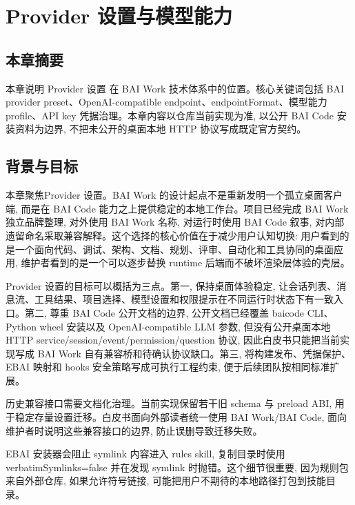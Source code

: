 \chapter{Provider 设置与模型能力}
\section{本章摘要}
本章说明 Provider 设置 在 BAI Work 技术体系中的位置。核心关键词包括 BAI provider preset、OpenAI-compatible endpoint、endpointFormat、模型能力 profile、API key 凭据治理。本章内容以仓库当前实现为准, 以公开 BAI Code 安装资料为边界, 不把未公开的桌面本地 HTTP 协议写成既定官方契约。

\section{背景与目标}
本章聚焦Provider 设置。BAI Work 的设计起点不是重新发明一个孤立桌面客户端, 而是在 BAI Code 能力之上提供稳定的本地工作台。项目已经完成 BAI Work 独立品牌整理, 对外使用 BAI Work 名称, 对运行时使用 BAI Code 叙事, 对内部遗留命名采取兼容解释。这个选择的核心价值在于减少用户认知切换: 用户看到的是一个面向代码、调试、架构、文档、规划、评审、自动化和工具协同的桌面应用, 维护者看到的是一个可以逐步替换 runtime 后端而不破坏渲染层体验的壳层。

Provider 设置的目标可以概括为三点。第一, 保持桌面体验稳定, 让会话列表、消息流、工具结果、项目选择、模型设置和权限提示在不同运行时状态下有一致入口。第二, 尊重 BAI Code 公开文档的边界, 公开文档已经覆盖 baicode CLI、Python wheel 安装以及 OpenAI-compatible LLM 参数, 但没有公开桌面本地 HTTP service/session/event/permission/question 协议, 因此白皮书只能把当前实现写成 BAI Work 自有兼容桥和待确认协议缺口。第三, 将构建发布、凭据保护、EBAI 映射和 hooks 安全策略写成可执行工程约束, 便于后续团队按相同标准扩展。

历史兼容接口需要文档化治理。当前实现保留若干旧 schema 与 preload ABI, 用于稳定存量设置迁移。白皮书面向外部读者统一使用 BAI Work/BAI Code, 面向维护者时说明这些兼容接口的边界, 防止误删导致迁移失败。

EBAI 安装器会阻止 symlink 内容进入 rules skill, 复制目录时使用 verbatimSymlinks=false 并在发现 symlink 时抛错。这个细节很重要, 因为规则包来自外部仓库, 如果允许符号链接, 可能把用户不期待的本地路径打包到技能目录。


